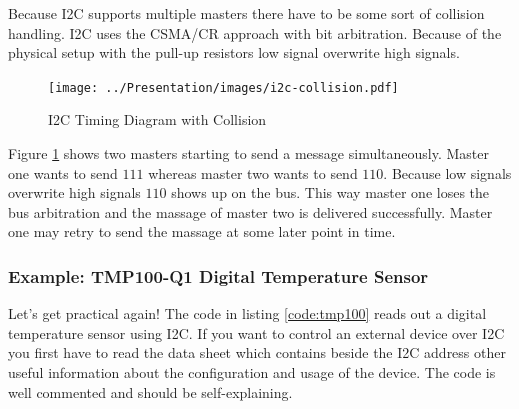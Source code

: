 \documentclass[pdftex,12pt,a4paper,fleqn]{scrartcl}
\begin{document}
Because I2C supports multiple masters there have to be some sort of collision handling. I2C uses the CSMA/CR approach with bit arbitration. Because of the physical setup with the pull-up resistors low signal overwrite high signals.

\begin{figure}[H]	
	\centering
  \texttt{[image: ../Presentation/images/i2c-collision.pdf]}
  \caption{I2C Timing Diagram with Collision}
  \label{fig:i2c_collision}
\end{figure}

Figure \ref{fig:i2c_collision} shows two masters starting to send a message simultaneously. Master one wants to send $111$ whereas master two wants to send $110$. Because low signals overwrite high signals $110$ shows up on the bus. This way master one loses the bus arbitration and the massage of master two is delivered successfully. Master one may retry to send the massage at some later point in time.

\subsubsection{Example: TMP100-Q1 Digital Temperature Sensor}
Let's get practical again! The code in listing \ref{code:tmp100} reads out a digital temperature sensor using I2C. If you want to control an external device over I2C you first have to read the data sheet which contains beside the I2C address other useful information about the configuration and usage of the device. The code is well commented and should be self-explaining.
\end{document}
